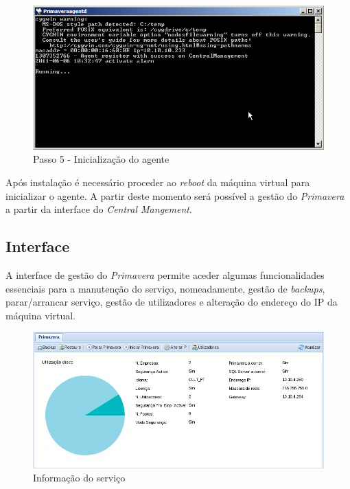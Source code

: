 \begin{figure}[H]
    \begin{center}
    \includegraphics[scale=0.38]{screenshots/primavera/primaverainstall_05.png}
    \caption{Passo 5 - Inicialização do agente}
    \label{fig:primavera_install_passo5}
    \end{center}
\end{figure}

Após instalação é necessário proceder ao \textit{reboot} da máquina virtual para inicializar o agente.
A partir deste momento será possível a gestão do \textit{Primavera} a partir da interface do \textit{Central Mangement}.

\subsection{Interface}

A interface de gestão do \textit{Primavera} permite aceder algumas funcionalidades essenciais para a manutenção do serviço, nomeadamente, gestão de \textit{backups}, parar/arrancar serviço, gestão de utilizadores e alteração do endereço do IP da máquina virtual.

\begin{figure}[H]
    \begin{center}
    \includegraphics[scale=0.38]{screenshots/primavera/primavera_main.png}
    \caption{Informação do serviço}
    \label{fig:primavera_info}
    \end{center}
\end{figure}

